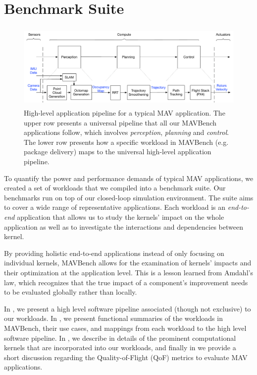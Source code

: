 \section{Benchmark Suite} 
\label{sec:mavbench}

\begin{figure}[t]
\centering
\includegraphics[height=1.65in, keepaspectratio]{figs/software_pipeline}
\caption{High-level application pipeline for a typical MAV application. The upper row presents a universal pipeline that all our MAVBench applications follow, which involves \emph{perception}, \emph{planning} and \emph{control}. The lower row presents how a specific workload in MAVBench (e.g. package delivery) maps to the universal high-level application pipeline.}
\label{fig:software_pipeline}
\end{figure}


To quantify the power and performance demands of typical MAV applications, we created a set of workloads that we compiled into a benchmark suite. Our benchmarks run on top of our closed-loop simulation environment. The suite aims to cover a wide range of representative applications. Each workload is an \textit{end-to-end} application that allows us to study the kernels' impact on the whole application as well as to investigate the interactions and dependencies between kernel. 

By providing holistic end-to-end applications instead of only focusing on individual kernels, MAVBench allows for the examination of kernels' impacts and their optimization at the application level. This is a lesson learned from Amdahl's law, which recognizes that the true impact of a component's improvement needs to be evaluated globally rather than locally.

In , we present a high level software pipeline associated (though not exclusive) to our workloads. In , we present functional summaries of the workloads in MAVBench, their use cases, and mappings from each workload to the high level software pipeline. In , we describe in details of the prominent computational kernels that are incorporated into our workloads, and finally in  we provide a short discussion regarding the Quality-of-Flight (QoF) metrics to evaluate MAV applications.

